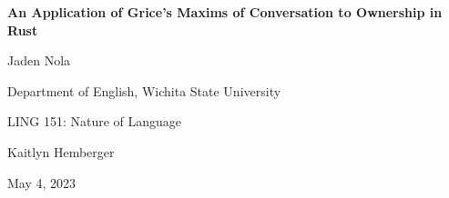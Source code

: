 \begin{titlepage}
  \begin{center}
    {\doublespacing
      \vspace*{4\baselineskip}

      \textbf{An Application of Grice's Maxims of Conversation to Ownership 
        in Rust}
      \vspace*{\baselineskip}

      Jaden Nola

      Department of English, Wichita State University

      LING 151: Nature of Language

      Kaitlyn Hemberger

      May 4, 2023\par
    }
  \end{center}
\end{titlepage}
